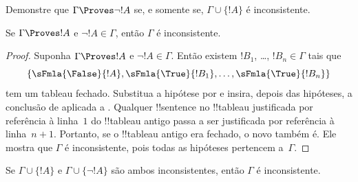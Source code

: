\documentclass[../../../include/open-logic-section]{subfiles}
\begin{document}
\begin{prob}
Demonstre que $\Gamma \Proves \lnot !A$ se, e somente se,
$\Gamma \cup \{!A\}$ é inconsistente.
\end{prob}

\begin{prop}
  Se $\Gamma \Proves !A$ e $\lnot !A \in \Gamma$, então $\Gamma$ é
  inconsistente.
\end{prop}

\begin{proof}
  Suponha $\Gamma \Proves !A$ e $\lnot !A \in \Gamma$. Então existem
  $!B_1$, \dots, $!B_n \in \Gamma$ tais que \
  \[
  \{\sFmla{\False}{!A}, \sFmla{\True}{!B_1}, \dots, \sFmla{\True}{!B_n}\}
  \]
  tem um tableau fechado. Substitua a hipótese  por
  \sFmla{\True}{\lnot !A} e insira, depois das hipóteses, a conclusão de
  \TRule{\True}{\lnot} aplicada a \sFmla{\False}{!A}. Qualquer
  !!{sentence} no !!{tableau} justificada por referência à linha~$1$ do
  !!{tableau} antigo passa a ser justificada por referência à linha~$n+1$.
  Portanto, se o !!{tableau} antigo era fechado, o novo também é. Ele mostra
  que $\Gamma$ é inconsistente, pois todas as hipóteses pertencem
  a~$\Gamma$.
\end{proof}

\begin{prop}
  Se $\Gamma \cup \{!A\}$ e $\Gamma \cup \{\lnot !A\}$ são ambos
  inconsistentes, então $\Gamma$ é inconsistente.
\end{prop}
\end{document}
